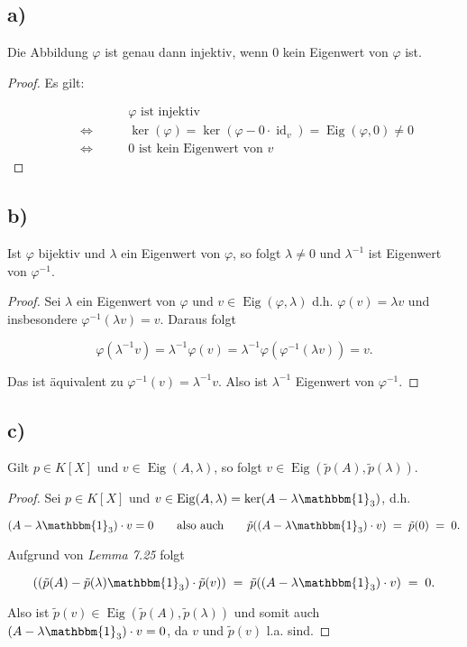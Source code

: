 \documentclass{article}
\DeclareMathOperator{\id}{id}
\DeclareMathOperator{\Kern}{ker}
\DeclareMathOperator{\eigenraum}{Eig}
\begin{document}
\subsection*{a)}

Die Abbildung $\varphi$ ist genau dann injektiv,
wenn $0$ kein Eigenwert von $\varphi$ ist.

\begin{proof}
Es gilt:

\[
\begin{aligned}
  &\text{$\varphi$ ist injektiv}\\
  \qquad\Leftrightarrow\qquad
  &\Kern(\varphi) = \Kern(\varphi - 0 \cdot \id_v) = \eigenraum(\varphi, 0) \neq 0 \\
  \qquad\Leftrightarrow\qquad
  &\text{$0$ ist kein Eigenwert von $v$}
\end{aligned}
\]
\end{proof}

\subsection*{b)}

Ist $\varphi$ bijektiv und $\lambda$ ein Eigenwert von $\varphi$,
so folgt
$\lambda \neq 0$
und $\lambda^{-1}$ ist Eigenwert von $\varphi^{-1}$.

\begin{proof}
  Sei $\lambda$ ein Eigenwert von $\varphi$
  und $v \in \eigenraum(\varphi, \lambda)$ d.h.
  $\varphi(v) = \lambda v$ und insbesondere $\varphi^{-1}(\lambda v) = v$.
  Daraus folgt

  \[
  \varphi(\lambda^{-1} v)
  = \lambda^{-1} \varphi(v)
  = \lambda^{-1} \varphi(\varphi^{-1}(\lambda v))
  = v.
  \]

  Das ist äquivalent zu $\varphi^{-1}(v) = \lambda^{-1} v$.
  Also ist $\lambda^{-1}$ Eigenwert von $\varphi^{-1}$.
\end{proof}

\subsection*{c)}

Gilt
$p \in K[X]$
und
$v \in \eigenraum(A, \lambda)$,
so folgt
$v \in \eigenraum(\tilde{p}(A), \tilde{p}(\lambda))$.

\begin{proof}
  Sei $p \in K[X]$
  und
  $v \in \eigenraum(A, \lambda) = \Kern(A - \lambda \mathbbm{1}_3)$,
  d.h.

  \[
  (A - \lambda \mathbbm{1}_3) \cdot v = 0
  \qquad\text{also auch}\qquad
  \tilde{p}((A - \lambda \mathbbm{1}_3) \cdot v) \;=\; \tilde{p}(0) \;=\; 0.
  \]

  Aufgrund von \textit{Lemma 7.25} folgt

  \[
  ((\tilde{p}(A) -\tilde{p}(\lambda) \mathbbm{1}_3) \cdot \tilde{p}(v))
  \;=\;
  \tilde{p}((A - \lambda \mathbbm{1}_3) \cdot v)
  \;=\;
  0.
  \]

  Also ist $\tilde{p}(v) \in \eigenraum(\tilde{p}(A), \tilde{p}(\lambda))$
  und somit auch $(A - \lambda \mathbbm{1}_3) \cdot v = 0$,
  da $v$ und $\tilde{p}(v)$ l.a. sind.
\end{proof}
\end{document}
